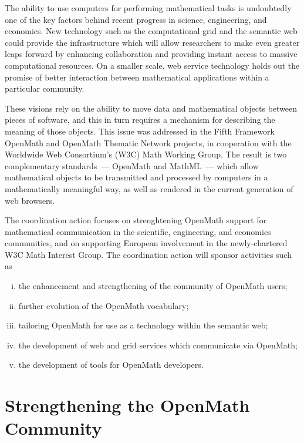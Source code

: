 \documentclass{euproposal}
\begin{document}
The ability to use computers for performing mathematical tasks is
undoubtedly one of the key factors behind recent progress in science,
engineering, and economics.  New technology such as the computational
grid and the semantic web could provide the infrastructure which will
allow researchers to make even greater leaps forward by enhancing
collaboration and providing instant access to massive computational
resources.  On a smaller scale, web service technology holds out the
promise of better interaction between mathematical applications within
a particular community.

These visions rely on the ability to move data and mathematical objects
between pieces of software, and this in turn requires a mechanism for
describing the meaning of those objects.  This issue was addressed in
the Fifth Framework OpenMath and OpenMath Thematic Network projects, in
cooperation with the Worldwide Web Consortium's (W3C) Math Working
Group.  The result is two complementary standards~--- OpenMath and
MathML~--- which allow mathematical objects to be transmitted and
processed by computers in a mathematically meaningful way, as well as
rendered in the current generation of web browsers.

The coordination action focuses on strenghtening OpenMath support for
mathematical communication in the scientific, engineering, and economics
communities, and on supporting European involvement in the
newly-chartered W3C Math Interest Group.  The coordination action will
sponsor activities such as

\begin{enumerate}[(i)]

\item the enhancement and strengthening of the community of OpenMath
users;

\item further evolution of the OpenMath vocabulary;

\item tailoring OpenMath for use as a technology within the semantic
web;

\item the development of web and grid services which communicate via
OpenMath;

\item the development of tools for OpenMath developers.

\end{enumerate}


\section{Strengthening the OpenMath Community} 
\label{community}
\end{document}
